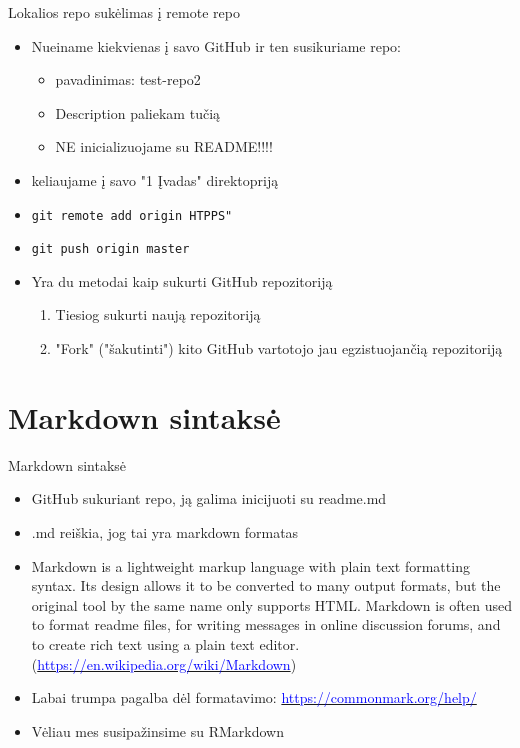 \documentclass[11pt,xcolor=table]{beamer}
\begin{document}
\begin{frame}{Lokalios repo sukėlimas į remote repo}
\begin{itemize}
\item Nueiname kiekvienas į savo GitHub ir ten susikuriame repo:
\begin{itemize}
\item pavadinimas: test-repo2
\item Description paliekam tučią
\item NE inicializuojame su README!!!!
\end{itemize}
\item keliaujame į savo "1 Įvadas" direktopriją
\item \colorbox{listinggray}{\lstinline|git remote add origin HTPPS"|}
\item \colorbox{listinggray}{\lstinline|git push origin master|}
\end{itemize}
\end{frame}


\begin{frame}
\begin{itemize}
\item Yra du metodai kaip sukurti GitHub repozitoriją
\begin{enumerate}
\item Tiesiog sukurti naują repozitoriją
\item "Fork" ("šakutinti") kito GitHub vartotojo jau egzistuojančią repozitoriją
\end{enumerate}
\end{itemize}
\end{frame}

\section{Markdown sintaksė}
\begin{frame}[fragile]{Markdown sintaksė}
\begin{itemize}
\item GitHub sukuriant repo, ją galima inicijuoti su readme.md
\item .md reiškia, jog tai yra markdown formatas
\item Markdown is a lightweight markup language with plain text formatting syntax. Its design allows it to be converted to many output formats, but the original tool by the same name only supports HTML. Markdown is often used to format readme files, for writing messages in online discussion forums, and to create rich text using a plain text editor. (\href{https://en.wikipedia.org/wiki/Markdown}{\textcolor{blue}{https://en.wikipedia.org/wiki/Markdown}})
\item Labai trumpa pagalba dėl formatavimo: \href{https://commonmark.org/help/}{\textcolor{blue}{https://commonmark.org/help/}}
\item Vėliau mes susipažinsime su RMarkdown
\end{itemize}
\end{frame}
\end{document}
